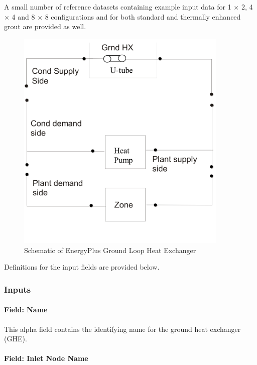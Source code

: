 A small number of reference datasets containing example input data for 1 $\times$ 2, 4 $\times$ 4 and 8 $\times$ 8 configurations and for both standard and thermally enhanced grout are provided as well.

\begin{figure}[hbtp] %
\centering
\includegraphics[width=0.9\textwidth, height=0.9\textheight, keepaspectratio=true]{media/image202.png}
\caption{Schematic of EnergyPlus Ground Loop Heat Exchanger \protect \label{fig:schematic-of-energyplus-ground-loop-heat}}
\end{figure}

Definitions for the input fields are provided below.

\subsubsection{Inputs}\label{inputs-10-002}

\paragraph{Field: Name}\label{field-name-9-003}

This alpha field contains the identifying name for the ground heat exchanger (GHE).

\paragraph{Field: Inlet Node Name}\label{field-inlet-node-name-000}

